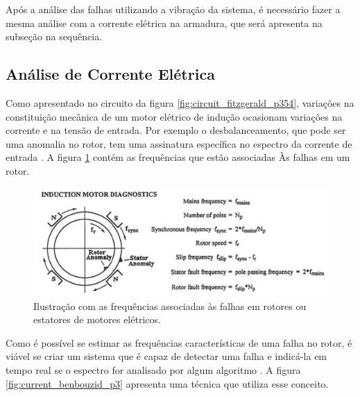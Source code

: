 Após a análise das falhas utilizando a vibração da sistema, é necessário fazer a mesma análise com a corrente elétrica na armadura, 
que será apresenta na subseção na sequência.


% 

\subsection{Análise de Corrente Elétrica }\label{sec:}

Como apresentado no circuito da figura \ref{fig:circuit_fitzgerald_p354}, variações na constituição mecânica de um motor elétrico de 
indução ocasionam variações na corrente e na tensão de entrada. Por exemplo o desbalanceamento, que pode ser uma anomalia no rotor,
tem uma assinatura específica no espectro da corrente de entrada \cite{Wu2013}.  A figura \ref{fig:fault_freq_randall_p55} contém as
frequências que estão associadas Às falhas em um rotor.

\begin{figure}[H]
    \caption{Ilustração com as frequências associadas às falhas em rotores ou estatores de motores elétricos.}
    \begin{center}
        \includegraphics[scale=.35]{referencial/img/fault_freq_randall_p55.png}
    \end{center}
    \label{fig:fault_freq_randall_p55}
\end{figure}

Como é possível se estimar as frequências características de uma falha no rotor, é viável se criar um sistema que é capaz de detectar uma 
falha e indicá-la em tempo real se o espectro for analisado por algum algoritmo \cite{El1999}. A figura \ref{fig:current_benbouzid_p3} apresenta uma
técnica que utiliza esse conceito.

